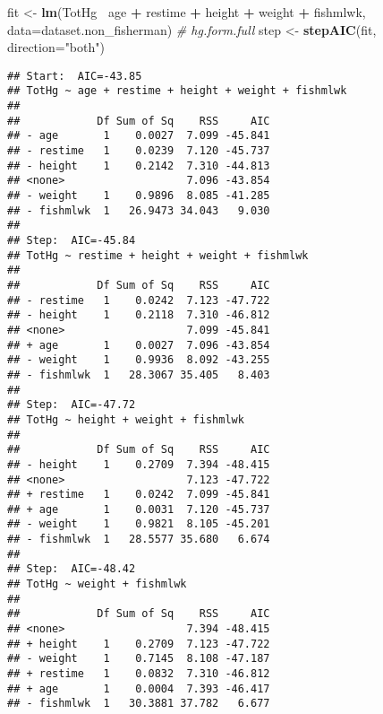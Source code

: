 \documentclass[12pt,]{article}
\newenvironment{Shaded}{\begin{snugshade}}{\end{snugshade}}
\newcommand{\KeywordTok}[1]{\textcolor[rgb]{0.13,0.29,0.53}{\textbf{#1}}}
\newcommand{\DataTypeTok}[1]{\textcolor[rgb]{0.13,0.29,0.53}{#1}}
\newcommand{\StringTok}[1]{\textcolor[rgb]{0.31,0.60,0.02}{#1}}
\newcommand{\CommentTok}[1]{\textcolor[rgb]{0.56,0.35,0.01}{\textit{#1}}}
\newcommand{\OperatorTok}[1]{\textcolor[rgb]{0.81,0.36,0.00}{\textbf{#1}}}
\newcommand{\NormalTok}[1]{#1}
\begin{document}
\begin{Shaded}
\begin{Highlighting}[]
\NormalTok{fit <-}\StringTok{ }\KeywordTok{lm}\NormalTok{(TotHg}\OperatorTok{~}\StringTok{ }\NormalTok{age }\OperatorTok{+}\StringTok{ }\NormalTok{restime }\OperatorTok{+}\StringTok{ }\NormalTok{height }\OperatorTok{+}\StringTok{ }\NormalTok{weight }\OperatorTok{+}\StringTok{ }\NormalTok{fishmlwk, }\DataTypeTok{data=}\NormalTok{dataset.non_fisherman) }\CommentTok{# hg.form.full}
\NormalTok{step <-}\StringTok{ }\KeywordTok{stepAIC}\NormalTok{(fit, }\DataTypeTok{direction=}\StringTok{"both"}\NormalTok{)}
\end{Highlighting}
\end{Shaded}

\begin{verbatim}
## Start:  AIC=-43.85
## TotHg ~ age + restime + height + weight + fishmlwk
## 
##            Df Sum of Sq    RSS     AIC
## - age       1    0.0027  7.099 -45.841
## - restime   1    0.0239  7.120 -45.737
## - height    1    0.2142  7.310 -44.813
## <none>                   7.096 -43.854
## - weight    1    0.9896  8.085 -41.285
## - fishmlwk  1   26.9473 34.043   9.030
## 
## Step:  AIC=-45.84
## TotHg ~ restime + height + weight + fishmlwk
## 
##            Df Sum of Sq    RSS     AIC
## - restime   1    0.0242  7.123 -47.722
## - height    1    0.2118  7.310 -46.812
## <none>                   7.099 -45.841
## + age       1    0.0027  7.096 -43.854
## - weight    1    0.9936  8.092 -43.255
## - fishmlwk  1   28.3067 35.405   8.403
## 
## Step:  AIC=-47.72
## TotHg ~ height + weight + fishmlwk
## 
##            Df Sum of Sq    RSS     AIC
## - height    1    0.2709  7.394 -48.415
## <none>                   7.123 -47.722
## + restime   1    0.0242  7.099 -45.841
## + age       1    0.0031  7.120 -45.737
## - weight    1    0.9821  8.105 -45.201
## - fishmlwk  1   28.5577 35.680   6.674
## 
## Step:  AIC=-48.42
## TotHg ~ weight + fishmlwk
## 
##            Df Sum of Sq    RSS     AIC
## <none>                   7.394 -48.415
## + height    1    0.2709  7.123 -47.722
## - weight    1    0.7145  8.108 -47.187
## + restime   1    0.0832  7.310 -46.812
## + age       1    0.0004  7.393 -46.417
## - fishmlwk  1   30.3881 37.782   6.677
\end{verbatim}

\begin{Shaded}
\end{Shaded}
\end{document}
